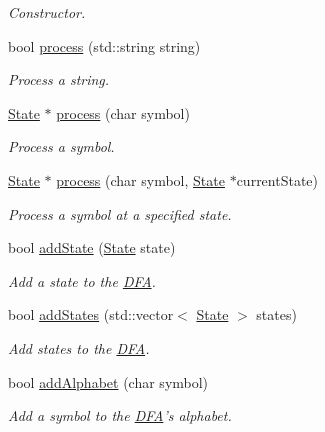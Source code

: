 \begin{DoxyCompactItemize}
\begin{DoxyCompactList}\small\item\em Constructor. \end{DoxyCompactList}\item 
bool \hyperlink{classFA_1_1DFA_ac064d14ca697ab4f466fecef59794150}{process} (std\-::string string)
\begin{DoxyCompactList}\small\item\em Process a string. \end{DoxyCompactList}\item 
\hyperlink{classFA_1_1State}{State} $\ast$ \hyperlink{classFA_1_1DFA_ad58c650b3fe4997560d24a6a4459dab5}{process} (char symbol)
\begin{DoxyCompactList}\small\item\em Process a symbol. \end{DoxyCompactList}\item 
\hyperlink{classFA_1_1State}{State} $\ast$ \hyperlink{classFA_1_1DFA_a63940f64c434af04a97ff101d52b83a1}{process} (char symbol, \hyperlink{classFA_1_1State}{State} $\ast$current\-State)
\begin{DoxyCompactList}\small\item\em Process a symbol at a specified state. \end{DoxyCompactList}\item 
bool \hyperlink{classFA_1_1DFA_a4f83314cd4904b8b8bef8df1d44ed311}{add\-State} (\hyperlink{classFA_1_1State}{State} state)
\begin{DoxyCompactList}\small\item\em Add a state to the \hyperlink{classFA_1_1DFA}{D\-F\-A}. \end{DoxyCompactList}\item 
bool \hyperlink{classFA_1_1DFA_a54b2fd16cd8a09b3d39267f496b3091c}{add\-States} (std\-::vector$<$ \hyperlink{classFA_1_1State}{State} $>$ states)
\begin{DoxyCompactList}\small\item\em Add states to the \hyperlink{classFA_1_1DFA}{D\-F\-A}. \end{DoxyCompactList}\item 
bool \hyperlink{classFA_1_1DFA_a178995c0e4e6cd3113d689aab95dbc73}{add\-Alphabet} (char symbol)
\begin{DoxyCompactList}\small\item\em Add a symbol to the \hyperlink{classFA_1_1DFA}{D\-F\-A}'s alphabet. \end{DoxyCompactList}\item 

\end{DoxyCompactItemize}
